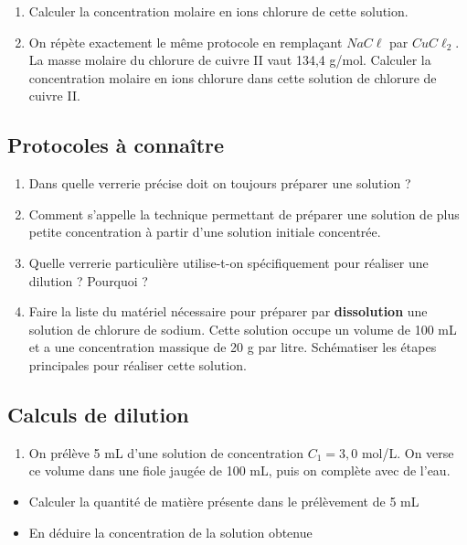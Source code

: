 \documentclass[
]{book}
\providecommand{\tightlist}{%
  \setlength{\itemsep}{0pt}\setlength{\parskip}{0pt}}
\def\tightlist{}
\begin{document}
\begin{enumerate}
\def\labelenumi{\alph{enumi}.}
\tightlist
\item
  Calculer la concentration molaire en ions chlorure de cette solution.
\item
  On répète exactement le même protocole en remplaçant \(NaC\ell\) par \(CuC\ell_2\). La masse molaire du chlorure de cuivre II vaut 134,4 g/mol. Calculer la concentration molaire en ions chlorure dans cette solution de chlorure de cuivre II.
\end{enumerate}

\hypertarget{protocoles-uxe0-connauxeetre}{%
\subsection{Protocoles à connaître}\label{protocoles-uxe0-connauxeetre}}

\begin{enumerate}
\def\labelenumi{\arabic{enumi}.}
\tightlist
\item
  Dans quelle verrerie précise doit on toujours préparer une solution ?
\item
  Comment s'appelle la technique permettant de préparer une solution de plus petite concentration à partir d'une solution initiale concentrée.
\item
  Quelle verrerie particulière utilise-t-on spécifiquement pour réaliser une dilution ? Pourquoi ?
\item
  Faire la liste du matériel nécessaire pour préparer par \textbf{dissolution} une solution de chlorure de sodium. Cette solution occupe un volume de 100 mL et a une concentration massique de 20 g par litre. Schématiser les étapes principales pour réaliser cette solution.
\end{enumerate}

\hypertarget{calculs-de-dilution}{%
\subsection{Calculs de dilution}\label{calculs-de-dilution}}

\begin{enumerate}
\def\labelenumi{\arabic{enumi}.}
\tightlist
\item
  On prélève 5 mL d'une solution de concentration \(C_1=3,0\) mol/L. On verse ce volume dans une fiole jaugée de 100 mL, puis on complète avec de l'eau.
\end{enumerate}

\begin{itemize}
\tightlist
\item
  Calculer la quantité de matière présente dans le prélèvement de 5 mL
\item
  En déduire la concentration de la solution obtenue
\end{itemize}
\end{document}
